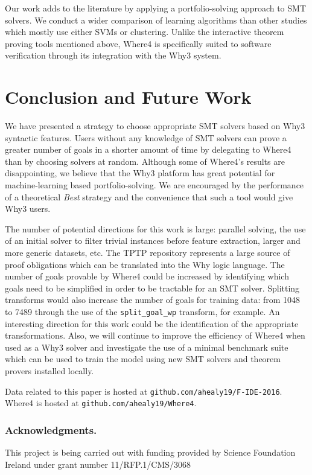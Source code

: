 \documentclass[runningheads,a4paper]{llncs}
\begin{document}
Our work adds to the literature by applying a portfolio-solving approach to SMT solvers. We conduct a wider comparison of learning algorithms than other studies which mostly use either SVMs or clustering. Unlike the interactive theorem proving tools mentioned above, \textsf{Where4} is specifically suited to software verification through its integration with the \textsf{Why3} system.

\section{Conclusion and Future Work}

We have presented a strategy to choose appropriate SMT solvers based on \textsf{Why3} syntactic features. Users without any knowledge of SMT solvers can prove a greater number of goals in a shorter amount of time by delegating to \textsf{Where4} than by choosing solvers at random. Although some of \textsf{Where4}'s results are disappointing, we believe that the \textsf{Why3} platform has great potential for machine-learning based portfolio-solving. We are encouraged by the performance of a theoretical \textit{Best} strategy and the convenience that such a tool would give \textsf{Why3} users.

The number of potential directions for this work is large: parallel solving, the use of an initial solver to filter trivial instances before feature extraction, larger and more generic datasets, etc. 
The TPTP repository represents a large source of proof obligations which can be translated into the Why logic language. The number of goals provable by \textsf{Where4} could be increased by identifying which goals need to be simplified in order to be tractable for an SMT solver. Splitting transforms would also increase the number of goals for training data: from 1048 to 7489 through the use of the \texttt{split\_goal\_wp} transform, for example.  An interesting direction for this work could be the identification of the appropriate transformations. Also, we will continue to improve the efficiency of \textsf{Where4} when used as a \textsf{Why3} solver and investigate the use of a minimal benchmark suite which can be used to train the model using new SMT solvers and theorem provers installed locally.  

Data related to this paper is hosted at \texttt{github.com/ahealy19/F-IDE-2016}. \textsf{Where4} is hosted at \texttt{github.com/ahealy19/Where4}. 

\subsubsection*{Acknowledgments.}This project is being carried out with funding provided by Science Foundation Ireland under grant number 11/RFP.1/CMS/3068



\end{document}

